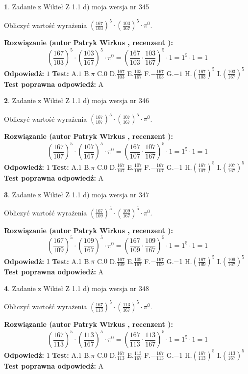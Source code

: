 \documentclass[12pt, a4paper]{article}
\theoremstyle{definition} %
\newtheorem{zad}{}
\newcommand{\zadStart}[1]{\begin{zad}#1\newline}
\newcommand{\zadStop}{\end{zad}}
\newcommand{\rozwStart}[2]{\noindent \textbf{Rozwiązanie (autor #1 , recenzent #2): }\newline}
\newcommand{\rozwStop}{\newline}
\newcommand{\odpStart}{\noindent \textbf{Odpowiedź:}\newline}
\newcommand{\odpStop}{\newline}
\newcommand{\testStart}{\noindent \textbf{Test:}\newline}
\newcommand{\testStop}{\newline}
\newcommand{\kluczStart}{\noindent \textbf{Test poprawna odpowiedź:}\newline}
\newcommand{\kluczStop}{\newline}
\begin{document}
\zadStart{Zadanie z Wikieł Z 1.1 d) moja wersja nr 345}

Obliczyć wartość wyrażenia $(\frac{167}{103})^{5} \cdot (\frac{103}{167})^{5} \cdot \pi^{0}$.
\zadStop
\rozwStart{Patryk Wirkus}{}
$$(\frac{167}{103})^{5} \cdot (\frac{103}{167})^{5} \cdot \pi^{0} = (\frac{167}{103} \cdot \frac{103}{167})^{5} \cdot 1 = 1^{5} \cdot 1 = 1$$
\rozwStop
\odpStart
$1$
\odpStop
\testStart
A.$1$ B.$\pi$ C.$0$ D.$\frac{167}{103}$ E.$\frac{103}{167}$
F.$-\frac{167}{103}$ G.$-1$
H.$(\frac{167}{103})^{5}$
I.$(\frac{103}{167})^{5}$
\testStop
\kluczStart
A
\kluczStop



\zadStart{Zadanie z Wikieł Z 1.1 d) moja wersja nr 346}

Obliczyć wartość wyrażenia $(\frac{167}{107})^{5} \cdot (\frac{107}{167})^{5} \cdot \pi^{0}$.
\zadStop
\rozwStart{Patryk Wirkus}{}
$$(\frac{167}{107})^{5} \cdot (\frac{107}{167})^{5} \cdot \pi^{0} = (\frac{167}{107} \cdot \frac{107}{167})^{5} \cdot 1 = 1^{5} \cdot 1 = 1$$
\rozwStop
\odpStart
$1$
\odpStop
\testStart
A.$1$ B.$\pi$ C.$0$ D.$\frac{167}{107}$ E.$\frac{107}{167}$
F.$-\frac{167}{107}$ G.$-1$
H.$(\frac{167}{107})^{5}$
I.$(\frac{107}{167})^{5}$
\testStop
\kluczStart
A
\kluczStop



\zadStart{Zadanie z Wikieł Z 1.1 d) moja wersja nr 347}

Obliczyć wartość wyrażenia $(\frac{167}{109})^{5} \cdot (\frac{109}{167})^{5} \cdot \pi^{0}$.
\zadStop
\rozwStart{Patryk Wirkus}{}
$$(\frac{167}{109})^{5} \cdot (\frac{109}{167})^{5} \cdot \pi^{0} = (\frac{167}{109} \cdot \frac{109}{167})^{5} \cdot 1 = 1^{5} \cdot 1 = 1$$
\rozwStop
\odpStart
$1$
\odpStop
\testStart
A.$1$ B.$\pi$ C.$0$ D.$\frac{167}{109}$ E.$\frac{109}{167}$
F.$-\frac{167}{109}$ G.$-1$
H.$(\frac{167}{109})^{5}$
I.$(\frac{109}{167})^{5}$
\testStop
\kluczStart
A
\kluczStop



\zadStart{Zadanie z Wikieł Z 1.1 d) moja wersja nr 348}

Obliczyć wartość wyrażenia $(\frac{167}{113})^{5} \cdot (\frac{113}{167})^{5} \cdot \pi^{0}$.
\zadStop
\rozwStart{Patryk Wirkus}{}
$$(\frac{167}{113})^{5} \cdot (\frac{113}{167})^{5} \cdot \pi^{0} = (\frac{167}{113} \cdot \frac{113}{167})^{5} \cdot 1 = 1^{5} \cdot 1 = 1$$
\rozwStop
\odpStart
$1$
\odpStop
\testStart
A.$1$ B.$\pi$ C.$0$ D.$\frac{167}{113}$ E.$\frac{113}{167}$
F.$-\frac{167}{113}$ G.$-1$
H.$(\frac{167}{113})^{5}$
I.$(\frac{113}{167})^{5}$
\testStop
\kluczStart
A
\kluczStop
\end{document}
